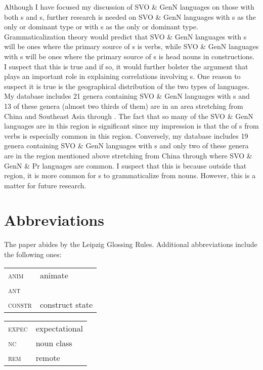 \documentclass[output=paper]{langsci/langscibook}
\begin{document}
Although I have focused my discussion of SVO \& GenN languages on those with both s and s, further research is needed on SVO \& GenN languages with s as the only or dominant type or with s as the only or dominant type. Grammaticalization theory would predict that SVO \& GenN languages with s will be ones where the primary source of s is verbs, while SVO \& GenN languages with s will be ones where the primary source of s is head nouns in  constructions. I suspect that this is true and if so, it would further bolster the argument that  plays an important role in explaining correlations involving s. One reason to suspect it is true is the geographical distribution of the two types of languages. My database includes 21 genera containing SVO \& GenN languages with s and 13 of these genera (almost two thirds of them) are in an area stretching from China and Southeast Asia through . The fact that so many of the SVO \& GenN languages are in this region is significant since my impression is that the  of s from verbs is especially common in this region. Conversely, my database includes 19 genera containing SVO \& GenN languages with s and only two of these genera are in the region mentioned above stretching from China through  where SVO \& GenN \& Pr languages are common. I suspect that this is because outside that region, it is more common for s to grammaticalize from nouns. However, this is a matter for future research.

\section*{Abbreviations}

The paper abides by the Leipzig Glossing Rules. Additional abbreviations include the following ones:\\


\begin{tabularx}{.45\textwidth}{lQ}
\textsc{anim}  &animate \\
\textsc{ant}  &\\
\textsc{constr} & construct state\\
\end{tabularx}
\begin{tabularx}{.45\textwidth}{lQ}
\textsc{expec} & expectational\\
\textsc{nc} & noun class\\
\textsc{rem}  &remote\\
\end{tabularx}
\end{document}

